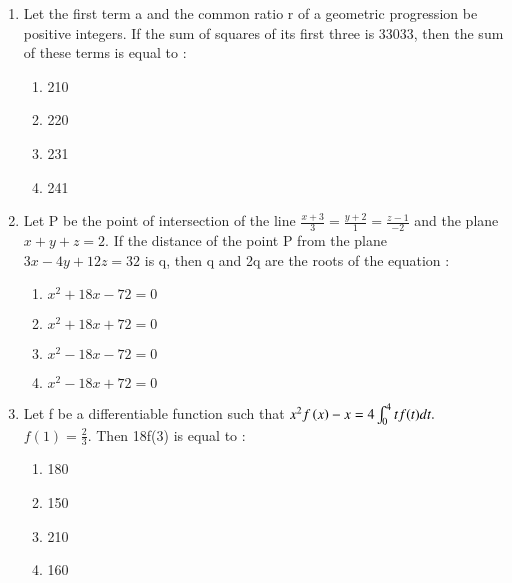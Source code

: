 \documentclass[journal]{IEEEtran}
\begin{document}
\begin{enumerate}
    \item Let the first term a and the common ratio r of a geometric progression be positive integers. If the sum of squares of its first three is 33033, then the sum of these terms is equal to :
    \begin{multicols}{4}
            \begin{enumerate}
              \item 210
              \item 220
              \item 231
              \item 241
            \end{enumerate}
        \end{multicols}
    
    

    \item Let P  be the point of intersection of the line $\frac{x+3}{3}=\frac{y+2}{1}=\frac{z-1}{-2}$ and the plane  $x+y+z=2$. If the distance of the point P from the plane $3x-4y+12z=32$ is q, then q and 2q are the roots of the equation :
    \begin{multicols}{4}
            \begin{enumerate}
              \item $x^2+18x-72=0$
              \item $x^2+18x+72=0$
              \item $x^2-18x-72=0$
              \item $x^2-18x+72=0$
            \end{enumerate}
        \end{multicols}
    \item Let f be a differentiable function such that $x^2f\left(x\right)-x=4\int_{0}^{4} tf(t)dt.$ $f(1)=\frac{2}{3}$. Then 18f(3) is  equal to :
    \begin{multicols}{4}
            \begin{enumerate}
              \item 180
              \item 150
              \item 210
              \item 160
            \end{enumerate}
        \end{multicols}
    

\end{enumerate}
\end{document}
